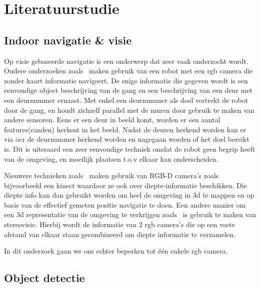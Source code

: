 
\chapter{Literatuurstudie}

    \section{Indoor navigatie \& visie}
        Op visie gebaseerde navigatie is een onderwerp dat zeer vaak onderzocht wordt. Oudere onderzoeken zoals~\cite{Tomono2000} maken gebruik van een robot met een \gls{rgb} camera die zonder kaart informatie navigeert.
        De enige informatie die gegeven wordt is een eenvoudige object beschrijving van de gang en een beschrijving van een deur met een deurnummer ernaast.
        Met enkel een deurnummer als doel vertrekt de robot door de gang, en houdt zichzelf parallel met de muren door gebruik te maken van andere sensoren. Eens er een deur in beeld komt, worden er een aantal features(randen)
        herkent in het beeld. Nadat de deuren herkend worden kan er via \gls{ocr} de deurnummer herkend worden en nagegaan worden of het doel bereikt is. Dit is uiteraard een zeer eenvoudige techniek omdat de robot geen begrip heeft van de omgeving, en moeilijk plaatsen t.o.v elkaar kan onderscheiden.

        Nieuwere technieken zoals~\cite{Henry10rgb-dmapping} maken gebruik van RGB-D camera's zoals bijvoorbeeld een kinect waardoor ze ook over diepte-informatie beschikken. Die diepte info kan dan gebruikt worden om heel
        de omgeving in 3d te mappen en op basis van de effectief gemeten positie navigatie te doen. Een andere manier om een 3d representatie van de omgeving te verkrijgen zoals~\cite{schmid2013} is gebruik te maken van stereovisie.
        Hierbij wordt de informatie van 2 \gls{rgb} camera's die op een vaste afstand van elkaar staan gecombineerd om diepte informatie te verzamelen.

        In dit onderzoek gaan we ons echter beperken tot \'{e}\'{e}n enkele \gls{rgb} camera.
        
    \section{Object detectie}

